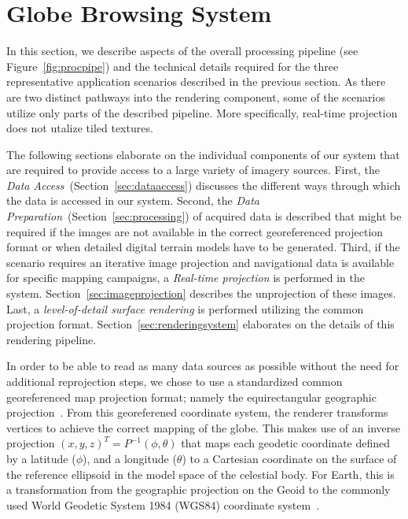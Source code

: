 \documentclass[journal]{vgtc}                %
\newcommand{\fig}[1]{Figure~\ref{fig:#1}}
\begin{document}

\section{Globe Browsing System} \label{sec:overview}
In this section, we describe aspects of the overall processing pipeline (see \fig{procpipe}) and the technical details required for the three representative application scenarios described in the previous section.
As there are two distinct pathways into the rendering component, some of the scenarios utilize only parts of the described pipeline. More specifically, real-time projection does not utalize tiled textures.

The following sections elaborate on the individual components of our system that are required to provide access to a large variety of imagery sources.
First, the \emph{Data Access}~(Section~\ref{sec:dataaccess}) discusses the different ways through which the data is accessed in our system.
Second, the \emph{Data Preparation}~(Section~\ref{sec:processing}) of acquired data is described that might be required if the images are not available in the correct georeferenced projection format or when detailed digital terrain models have to be generated.
Third, if the scenario requires an iterative image projection and navigational data is available for specific mapping campaigns, a \emph{Real-time projection} is performed in the system.
Section~\ref{sec:imageprojection} describes the unprojection of these images.
Last, a \emph{level-of-detail surface rendering} is performed utilizing the common projection format.
Section~\ref{sec:renderingsystem} elaborates on the details of this rendering pipeline.

In order to be able to read as many data sources as possible without the need for additional reprojection steps, we chose to use a standardized common georeferenced map projection format; namely the equirectangular geographic projection~\cite{snyder1997flattening}.
From this georeferened coordinate system, the renderer transforms vertices to achieve the correct mapping of the globe.
This makes use of an inverse projection $(x,y,z)^T = P^{-1}(\phi, \theta)$ that maps each geodetic coordinate defined by a latitude ($\phi$), and a longitude ($\theta$) to a Cartesian coordinate on the surface of the reference ellipsoid in the model space of the celestial body.
For Earth, this is a transformation from the geographic projection on the Geoid to the commonly used World Geodetic System 1984 (WGS84) coordinate system~\cite{decker1986world}.
\end{document}
